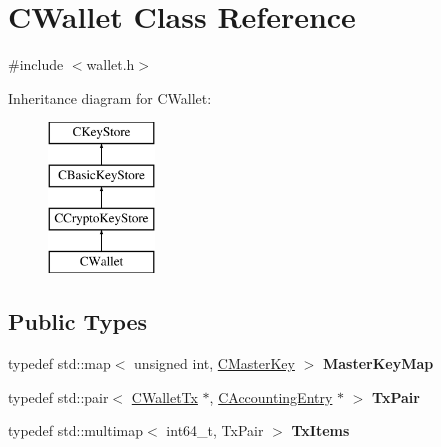 \hypertarget{class_c_wallet}{}\section{C\+Wallet Class Reference}
\label{class_c_wallet}


{\ttfamily \#include $<$wallet.\+h$>$}

Inheritance diagram for C\+Wallet\+:\begin{figure}[H]
\begin{center}
\leavevmode
\includegraphics[height=4.000000cm]{class_c_wallet}
\end{center}
\end{figure}
\subsection*{Public Types}
\begin{DoxyCompactItemize}
\item 
\mbox{\label{class_c_wallet_a0e21167a320a0ab8f15d0e11c6749a0e}} 
typedef std\+::map$<$ unsigned int, \mbox{\hyperlink{class_c_master_key}{C\+Master\+Key}} $>$ {\bfseries Master\+Key\+Map}
\item 
\mbox{\label{class_c_wallet_ad1557a7d200f70bc97319376a24c98a7}} 
typedef std\+::pair$<$ \mbox{\hyperlink{class_c_wallet_tx}{C\+Wallet\+Tx}} $\ast$, \mbox{\hyperlink{class_c_accounting_entry}{C\+Accounting\+Entry}} $\ast$ $>$ {\bfseries Tx\+Pair}
\item 
\mbox{\label{class_c_wallet_ac35fb148c0967ad24db292435b54ad85}} 
typedef std\+::multimap$<$ int64\+\_\+t, Tx\+Pair $>$ {\bfseries Tx\+Items}
\end{DoxyCompactItemize}

